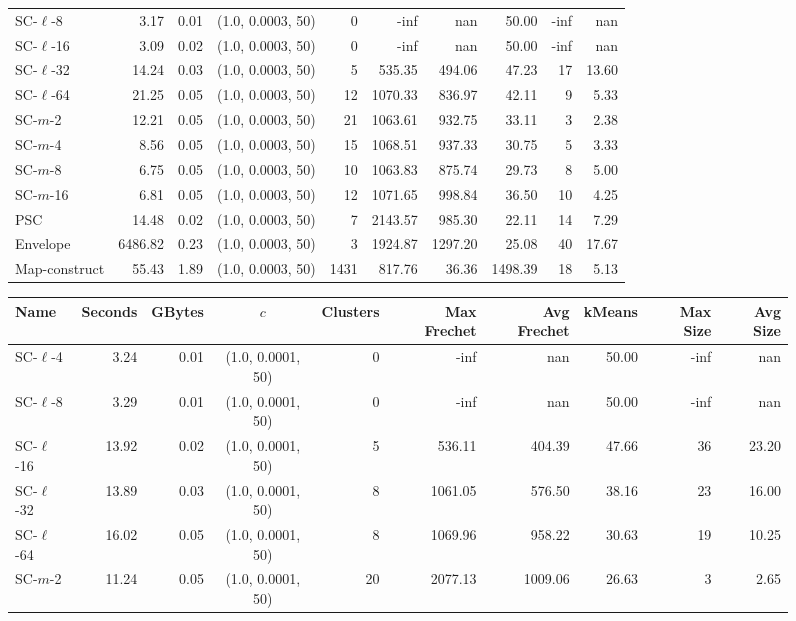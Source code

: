 \begin{figure}
\begin{center}
\begin{minipage}{\textwidth}
{\begin{tabular}{@{}lrrcrrrrrr@{}}
        SC-$\ell$-8 & 3.17 & 0.01 & (1.0, 0.0003, 50) & 0 & -inf & nan & 50.00 & -inf & nan\\
        SC-$\ell$-16 & 3.09 & 0.02 & (1.0, 0.0003, 50) & 0 & -inf & nan & 50.00 & -inf & nan\\
        SC-$\ell$-32 & 14.24 & 0.03 & (1.0, 0.0003, 50) & 5 & 535.35 & 494.06 & 47.23 & 17 & 13.60\\
        SC-$\ell$-64 & 21.25 & 0.05 & (1.0, 0.0003, 50) & 12 & 1070.33 & 836.97 & 42.11 & 9 & 5.33\\
        SC-$m$-2 & 12.21 & 0.05 & (1.0, 0.0003, 50) & 21 & 1063.61 & 932.75 & 33.11 & 3 & 2.38\\
        SC-$m$-4 & 8.56 & 0.05 & (1.0, 0.0003, 50) & 15 & 1068.51 & 937.33 & 30.75 & 5 & 3.33\\
        SC-$m$-8 & 6.75 & 0.05 & (1.0, 0.0003, 50) & 10 & 1063.83 & 875.74 & 29.73 & 8 & 5.00\\
        SC-$m$-16 & 6.81 & 0.05 & (1.0, 0.0003, 50) & 12 & 1071.65 & 998.84 & 36.50 & 10 & 4.25\\
        PSC & 14.48 & 0.02 & (1.0, 0.0003, 50) & 7 & 2143.57 & 985.30 & 22.11 & 14 & 7.29\\
        Envelope & 6486.82 & 0.23 & (1.0, 0.0003, 50) & 3 & 1924.87 & 1297.20 & 25.08 & 40 & 17.67\\
        Map-construct & 55.43 & 1.89 & (1.0, 0.0003, 50) & 1431 & 817.76 & 36.36 & 1498.39 & 18 & 5.13\\
        \bottomrule
    \end{tabular}
    }
    {
    \begin{tabular}{@{}lrrcrrrrrr@{}}
        \toprule
        Name & Seconds & GBytes & $c$ & Clusters & Max Frechet & Avg Frechet & kMeans & Max Size & Avg Size\\
        \midrule
        SC-$\ell$-4 & 3.24 & 0.01 & (1.0, 0.0001, 50) & 0 & -inf & nan & 50.00 & -inf & nan\\
        SC-$\ell$-8 & 3.29 & 0.01 & (1.0, 0.0001, 50) & 0 & -inf & nan & 50.00 & -inf & nan\\
        SC-$\ell$-16 & 13.92 & 0.02 & (1.0, 0.0001, 50) & 5 & 536.11 & 404.39 & 47.66 & 36 & 23.20\\
        SC-$\ell$-32 & 13.89 & 0.03 & (1.0, 0.0001, 50) & 8 & 1061.05 & 576.50 & 38.16 & 23 & 16.00\\
        SC-$\ell$-64 & 16.02 & 0.05 & (1.0, 0.0001, 50) & 8 & 1069.96 & 958.22 & 30.63 & 19 & 10.25\\
        SC-$m$-2 & 11.24 & 0.05 & (1.0, 0.0001, 50) & 20 & 2077.13 & 1009.06 & 26.63 & 3 & 2.65\\

\end{tabular}}
\end{minipage}
\end{center}
\end{figure}
